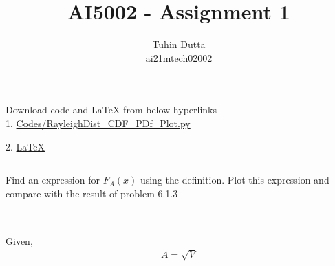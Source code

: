 \documentclass[journal,12pt,twocolumn]{IEEEtran}
\begin{document}
\providecommand{\mtx}[1]{\mathbf{#1}}
\providecommand{\fourier}{\overset{\mathcal{F}}{ \rightleftharpoons}}
\providecommand{\system}{\overset{\mathcal{H}}{ \longleftrightarrow}}
\newcommand{\solution}{\noindent \textbf{Solution: }}
\newcommand{\cosec}{\,\text{cosec}\,}
\providecommand{\dec}[2]{\ensuremath{\overset{#1}{\underset{#2}{\gtrless}}}}
\newcommand{\myvec}[1]{\ensuremath{\begin{pmatrix}#1\end{pmatrix}}}
\newcommand{\mydet}[1]{\ensuremath{\begin{vmatrix}#1\end{vmatrix}}}
\makeatletter
{}
\makeatother
\let\StandardTheFigure\thefigure
\let\vec\mathbf
\renewcommand{\thefigure}{\theproblem}
\def\putbox#1#2#3{\makebox[0in][l]{\makebox[#1][l]{}\raisebox{\baselineskip}[0in][0in]{\raisebox{#2}[0in][0in]{#3}}}}
     \def\rightbox#1{\makebox[0in][r]{#1}}
     \def\centbox#1{\makebox[0in]{#1}}
     \def\topbox#1{\raisebox{-\baselineskip}[0in][0in]{#1}}
     \def\midbox#1{\raisebox{-0.5\baselineskip}[0in][0in]{#1}}
\vspace{3cm}
\title{AI5002 - Assignment 1}
\author{Tuhin Dutta\\ ai21mtech02002}
\maketitle
\newpage
\bigskip
\renewcommand{\thefigure}{\theenumi}
\renewcommand{\thetable}{\theenumi}
\begin{mdframed}
Download code and LaTeX from below hyperlinks\\
1. \href{https://github.com/Tauhait/AI5002/blob/main/Assignment-1/Codes/RayleighDist\_CDF\_PDf\_Plot.py}{Codes/RayleighDist\_CDF\_PDf\_Plot.py}


2. \href{https://github.com/Tauhait/AI5002/tree/main/Assignment-1/LaTeX}{LaTeX}
\end{mdframed}
\subsection*{}
Find an expression for $F_A(x)$ using the definition. Plot this expression and compare with the result of problem 6.1.3
\subsection*{}\\
Given,
\begin{align}
A = \sqrt{V}
\end{align}
\end{document}
